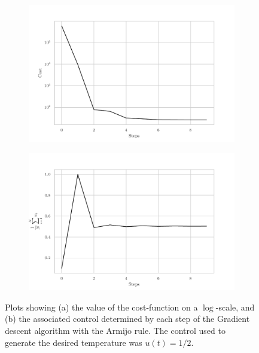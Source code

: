 \begin{figure}[pb]
    \centering
    \begin{subfigure}[b]{\textwidth}
        \includegraphics[width=\textwidth]{figures/cost_armijo_analytic_05.pdf}
        \caption{}
        \label{fig:armijo_cost}
    \end{subfigure}
    \begin{subfigure}[b]{\textwidth}
        \includegraphics[width=\textwidth]{figures/U_armijo_analytic_05.pdf}
        \caption{}
        \label{fig:armijo_control}
    \end{subfigure}
    \caption{Plots showing (a) the value of the cost-function on a $\log$-scale, and (b) the associated control determined by each step of the Gradient descent algorithm with the Armijo rule. The control used to generate the desired temperature was $u(t) = 1/2$.}
    \label{fig:armijo}
\end{figure}
